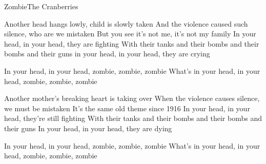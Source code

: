 \begin{song}{Zombie}{The Cranberries}{}


Another head hangs lowly, child is slowly taken
And the violence caused such silence, who are we mistaken
But you see it's not me, it's not my family
In your head, in your head, they are fighting
With their tanks and their bombs and their bombs and their guns
in your head, in your head, they are crying

In your head, in your head, zombie, zombie, zombie
What's in your head, in your head, zombie, zombie, zombie


Another mother's breaking heart is taking over
When the violence causes silence, we must be mistaken
It's the same old theme since 1916
In your head, in your head, they're still fighting
With their tanks and their bombs and their bombs and their guns
In your head, in your head, they are dying

In your head, in your head, zombie, zombie, zombie
What's in your head, in your head, zombie, zombie, zombie

\end{song}
